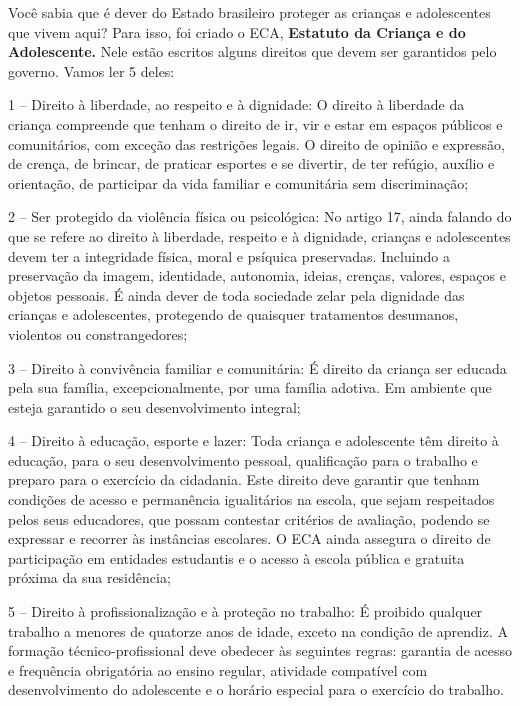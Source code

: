 Você sabia que é dever do Estado brasileiro proteger as crianças e
adolescentes que vivem aqui? Para isso, foi criado o ECA,
\textbf{Estatuto da Criança e do Adolescente.} Nele estão escritos
alguns direitos que devem ser garantidos pelo governo. Vamos ler 5
deles:

1 -- Direito à liberdade, ao respeito e à dignidade: O direito à
liberdade da criança compreende que tenham o direito de ir, vir e estar
em espaços públicos e comunitários, com exceção das restrições legais. O
direito de opinião e expressão, de crença, de brincar, de praticar
esportes e se divertir, de ter refúgio, auxílio e orientação, de
participar da vida familiar e comunitária sem discriminação;

2 -- Ser protegido da violência física ou psicológica: No artigo 17,
ainda falando do que se refere ao direito à liberdade, respeito e à
dignidade, crianças e adolescentes devem ter a integridade física, moral
e psíquica preservadas. Incluindo a preservação da imagem, identidade,
autonomia, ideias, crenças, valores, espaços e objetos pessoais. É ainda
dever de toda sociedade zelar pela dignidade das crianças e
adolescentes, protegendo de quaisquer tratamentos desumanos, violentos
ou constrangedores;

3 -- Direito à convivência familiar e comunitária: É direito da criança
ser educada pela sua família, excepcionalmente, por uma família adotiva.
Em ambiente que esteja garantido o seu desenvolvimento integral;

4 -- Direito à educação, esporte e lazer: Toda criança e adolescente têm
direito à educação, para o seu desenvolvimento pessoal, qualificação
para o trabalho e preparo para o exercício da cidadania. Este direito
deve garantir que tenham condições de acesso e permanência igualitários
na escola, que sejam respeitados pelos seus educadores, que possam
contestar critérios de avaliação, podendo se expressar e recorrer às
instâncias escolares. O ECA ainda assegura o direito de participação em
entidades estudantis e o acesso à escola pública e gratuita próxima da
sua residência;

5 -- Direito à profissionalização e à proteção no trabalho: É proibido
qualquer trabalho a menores de quatorze anos de idade, exceto na
condição de aprendiz. A formação técnico-profissional deve obedecer às
seguintes regras: garantia de acesso e frequência obrigatória ao ensino
regular, atividade compatível com desenvolvimento do adolescente e o
horário especial para o exercício do trabalho.

